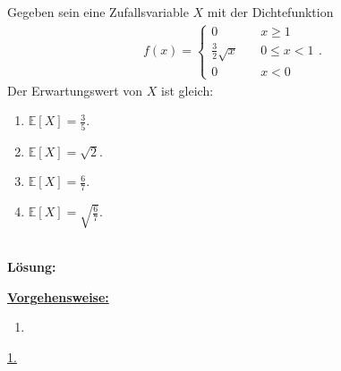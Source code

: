 \subsection*{}
Gegeben sein eine Zufallsvariable $ X $ mit der Dichtefunktion
\begin{align*}
	f(x)
	=
	\begin{cases}
		0 \quad &x \geq 1\\
		\frac{3}{2} \sqrt{x} \quad &0 \leq x < 1\\
		0 \quad &x<0
	\end{cases}.
\end{align*}
Der Erwartungswert von $ X $ ist gleich:
\renewcommand{\labelenumi}{(\alph{enumi})}
\begin{enumerate}
	\item 
	$\mathbb{E}[X] = \frac{3}{5}$.
	\item
	$\mathbb{E}[X] = \sqrt{2}$.
	\item
	$\mathbb{E}[X] = \frac{6}{7}$.
	\item
	$\mathbb{E}[X] = \sqrt{\frac{6}{7}}$.
\end{enumerate}
\ \\
\textbf{Lösung:}
\begin{mdframed}
\underline{\textbf{Vorgehensweise:}}
\renewcommand{\labelenumi}{\theenumi.}
\begin{enumerate}
\item 
\end{enumerate}
\end{mdframed}

\underline{1.}\\

\newpage

\newpage
